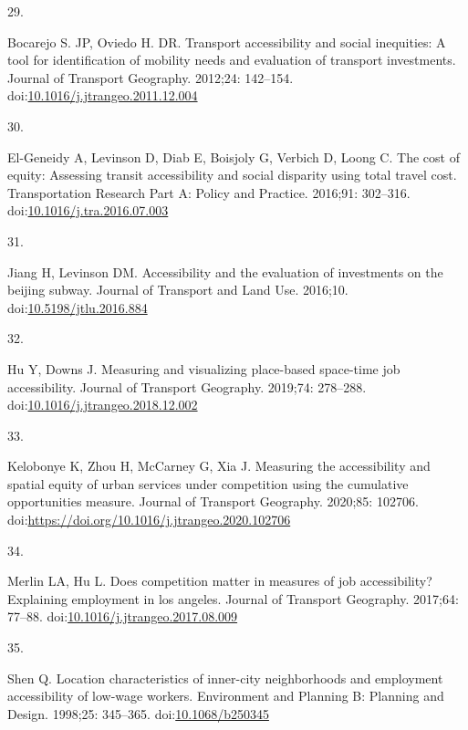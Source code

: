 \documentclass[10pt,letterpaper]{article}
\newlength{\cslhangindent}
\newlength{\csllabelwidth}
\newlength{\cslentryspacingunit} %
\newenvironment{CSLReferences}[2] %
 {%
  \setlength{\parindent}{0pt}
  \ifodd #1
  \let\oldpar\par
  \def\par{\hangindent=\cslhangindent\oldpar}
  \fi
  \setlength{\parskip}{#2\cslentryspacingunit}
 }%
 {}
\newcommand{\CSLLeftMargin}[1]{\parbox[t]{\csllabelwidth}{#1}}
\newcommand{\CSLRightInline}[1]{\parbox[t]{\linewidth - \csllabelwidth}{#1}\break}
\begin{document}
\begin{CSLReferences}{0}{0}
\leavevmode{}%
\CSLLeftMargin{29. }%
\CSLRightInline{Bocarejo S. JP, Oviedo H. DR. Transport accessibility
and social inequities: A tool for identification of mobility needs and
evaluation of transport investments. Journal of Transport Geography.
2012;24: 142--154.
doi:\href{https://doi.org/10.1016/j.jtrangeo.2011.12.004}{10.1016/j.jtrangeo.2011.12.004}}

\leavevmode{}%
\CSLLeftMargin{30. }%
\CSLRightInline{El-Geneidy A, Levinson D, Diab E, Boisjoly G, Verbich D,
Loong C. The cost of equity: {Assessing} transit accessibility and
social disparity using total travel cost. Transportation Research Part
A: Policy and Practice. 2016;91: 302--316.
doi:\href{https://doi.org/10.1016/j.tra.2016.07.003}{10.1016/j.tra.2016.07.003}}

\leavevmode{}%
\CSLLeftMargin{31. }%
\CSLRightInline{Jiang H, Levinson DM. Accessibility and the evaluation
of investments on the beijing subway. Journal of Transport and Land Use.
2016;10.
doi:\href{https://doi.org/10.5198/jtlu.2016.884}{10.5198/jtlu.2016.884}}

\leavevmode{}%
\CSLLeftMargin{32. }%
\CSLRightInline{Hu Y, Downs J. Measuring and visualizing place-based
space-time job accessibility. Journal of Transport Geography. 2019;74:
278--288.
doi:\href{https://doi.org/10.1016/j.jtrangeo.2018.12.002}{10.1016/j.jtrangeo.2018.12.002}}

\leavevmode{}%
\CSLLeftMargin{33. }%
\CSLRightInline{Kelobonye K, Zhou H, McCarney G, Xia J. Measuring the
accessibility and spatial equity of urban services under competition
using the cumulative opportunities measure. Journal of Transport
Geography. 2020;85: 102706.
doi:\url{https://doi.org/10.1016/j.jtrangeo.2020.102706}}

\leavevmode{}%
\CSLLeftMargin{34. }%
\CSLRightInline{Merlin LA, Hu L. Does competition matter in measures of
job accessibility? Explaining employment in los angeles. Journal of
Transport Geography. 2017;64: 77--88.
doi:\href{https://doi.org/10.1016/j.jtrangeo.2017.08.009}{10.1016/j.jtrangeo.2017.08.009}}

\leavevmode{}%
\CSLLeftMargin{35. }%
\CSLRightInline{Shen Q. Location characteristics of inner-city
neighborhoods and employment accessibility of low-wage workers.
Environment and Planning B: Planning and Design. 1998;25: 345--365.
doi:\href{https://doi.org/10.1068/b250345}{10.1068/b250345}}


\end{CSLReferences}
\end{document}
